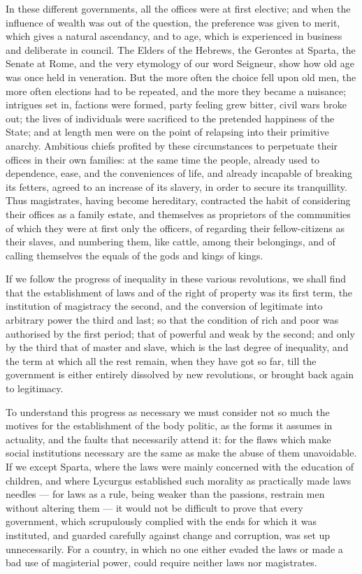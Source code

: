 \documentclass[12pt]{report}
\begin{document}
In these different governments, all the offices were at first elective; and when the influence of wealth was out of the question, the preference was given to merit, which gives a natural ascendancy, and to age, which is experienced in business and deliberate in council. The Elders of the Hebrews, the Gerontes at Sparta, the Senate at Rome, and the very etymology of our word Seigneur, show how old age was once held in veneration. But the more often the choice fell upon old men, the more often elections had to be repeated, and the more they became a nuisance; intrigues set in, factions were formed, party feeling grew bitter, civil wars broke out; the lives of individuals were sacrificed to the pretended happiness of the State; and at length men were on the point of relapsing into their primitive anarchy. Ambitious chiefs profited by these circumstances to perpetuate their offices in their own families: at the same time the people, already used to dependence, ease, and the conveniences of life, and already incapable of breaking its fetters, agreed to an increase of its slavery, in order to secure its tranquillity. Thus magistrates, having become hereditary, contracted the habit of considering their offices as a family estate, and themselves as proprietors of the communities of which they were at first only the officers, of regarding their fellow-citizens as their slaves, and numbering them, like cattle, among their belongings, and of calling themselves the equals of the gods and kings of kings.

If we follow the progress of inequality in these various revolutions, we shall find that the establishment of laws and of the right of property was its first term, the institution of magistracy the second, and the conversion of legitimate into arbitrary power the third and last; so that the condition of rich and poor was authorised by the first period; that of powerful and weak by the second; and only by the third that of master and slave, which is the last degree of inequality, and the term at which all the rest remain, when they have got so far, till the government is either entirely dissolved by new revolutions, or brought back again to legitimacy.

To understand this progress as necessary we must consider not so much the motives for the establishment of the body politic, as the forms it assumes in actuality, and the faults that necessarily attend it: for the flaws which make social institutions necessary are the same as make the abuse of them unavoidable. If we except Sparta, where the laws were mainly concerned with the education of children, and where Lycurgus established such morality as practically made laws needles — for laws as a rule, being weaker than the passions, restrain men without altering them — it would not be difficult to prove that every government, which scrupulously complied with the ends for which it was instituted, and guarded carefully against change and corruption, was set up unnecessarily. For a country, in which no one either evaded the laws or made a bad use of magisterial power, could require neither laws nor magistrates.
\end{document}
